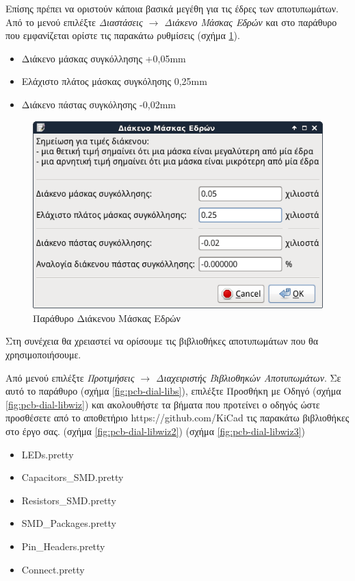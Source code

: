 \documentclass[a4paper]{article}
\begin{document}
Επίσης πρέπει να οριστούν κάποια βασικά μεγέθη για τις έδρες των αποτυπωμάτων. Από το μενού επιλέξτε \textit{Διαστάσεις $\rightarrow$ Διάκενο Μάσκας Εδρών} και στο παράθυρο που εμφανίζεται ορίστε τις παρακάτω ρυθμίσεις (σχήμα \ref{fig:pcb-dial-padclear}).

\begin{itemize}
    \item Διάκενο μάσκας συγκόλλησης +0,05mm
    \item Ελάχιστο πλάτος μάσκας συγκόλησης 0,25mm
    \item Διάκενο πάστας συγκόλησης -0,02mm
\end{itemize}

\begin{figure}
  \begin{center}
    \includegraphics[width=.5\textwidth]{img/pcb-dial-padclear.png}
    \caption{Παράθυρο Διάκενου Μάσκας Εδρών}
    \label{fig:pcb-dial-padclear}
  \end{center}
\end{figure}


Στη συνέχεια θα χρειαστεί να ορίσουμε τις βιβλιοθήκες αποτυπωμάτων που θα χρησιμοποιήσουμε. 

Από μενού επιλέξτε \textit{Προτιμήσεις $\rightarrow$ Διαχειριστής Βιβλιοθηκών Αποτυπωμάτων}. Σε αυτό το παράθυρο (σχήμα \ref{fig:pcb-dial-libs}), επιλέξτε Προσθήκη με Οδηγό (σχήμα \ref{fig:pcb-dial-libwiz}) και ακολουθήστε τα βήματα που προτείνει ο οδηγός ώστε προσθέσετε από το αποθετήριο https://github.com/KiCad τις παρακάτω βιβλιοθήκες στο έργο σας. (σχήμα \ref{fig:pcb-dial-libwiz2}) (σχήμα \ref{fig:pcb-dial-libwiz3}) 

\begin{itemize}
    \item LEDs.pretty
    \item Capacitors\_SMD.pretty
    \item Resistors\_SMD.pretty
    \item SMD\_Packages.pretty
    \item Pin\_Headers.pretty
    \item Connect.pretty
\end{itemize}
\end{document}
